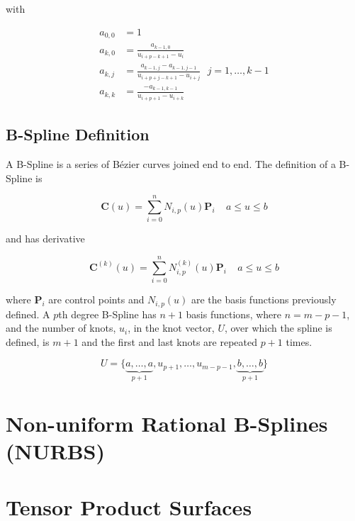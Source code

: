 with

\begin{align}
a_{0,0} &= 1\\
a_{k,0} &= \frac{a_{k-1,0}}{u_{i+p-k+1} - u_i}\\
a_{k,j} &= \frac{a_{k-1,j} - a_{k-1,j-1}}{u_{i+p+j-k+1} - u_{i+j} } ~~~ j=1,\ldots,k-1\\
a_{k,k} &= \frac{-a_{k-1,k-1}}{u_{i+p+1} - u_{i+k} }
\end{align}


\subsection{B-Spline Definition}
A B-Spline is a series of Bézier curves joined end to end.  The definition of a B-Spline is

\begin{equation} \textbf{C}(u) = \sum^n_{i=0}N_{i,p}(u) \textbf{P}_i~~~~~a\leq u \leq b \end{equation}

and has derivative

\begin{equation} \textbf{C}^{(k)}(u) = \sum^n_{i=0}N^{(k)}_{i,p}(u) \textbf{P}_i~~~~~a\leq u \leq b \end{equation}

where $\textbf{P}_i$ are control points and $N_{i,p}(u) $ are the basis functions previously defined. A $p$th degree B-Spline has $n+1$ basis functions, where $n = m-p-1$, and the number of knots, $u_i$, in the knot vector, $U$, over which the spline is defined, is $m+1$ and the first and last knots are repeated $p+1$ times.
 
\begin{equation} U = \{\underbrace{a,\ldots,a}_{p+1},u_{p+1},\ldots,u_{m-p-1},\underbrace{b,\ldots,b}_{p+1} \}  \end{equation}




\section{Non-uniform Rational B-Splines (NURBS)}

\section{Tensor Product Surfaces}

%
%  

 
